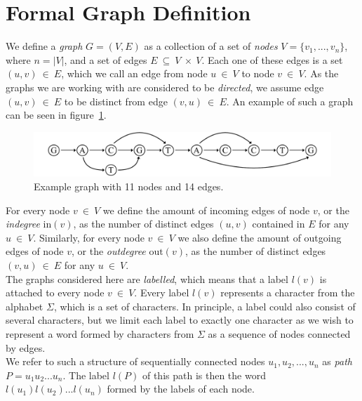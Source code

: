 \documentclass[a4paper,12pt,twoside,BCOR=10mm]{scrbook}
\begin{document}
\section{Formal Graph Definition}
\label{sec:graph_definition}
%
We define a \textit{graph} $ G = (V, E) $ as a collection of a set
of \textit{nodes} $ V = \{ v_1, ..., v_n \} $, where $ n = |V| $, and a set of edges $ E {\: \subseteq \:} V {\: \times \:} V $.
Each one of these edges is a set $ (u, v) {\: \in \:} E $,
which we call an edge from node $ u {\: \in \:} V $ to node $ v {\: \in \:} V $.
As the graphs we are working with are considered to be \textit{directed},
we assume edge $ (u, v) {\: \in \:} E $ to
be distinct from edge $ (v, u) {\: \in \:} E $.
An example of such a graph can be seen in figure~\ref{fig:evo_fig_graph_example}.

\begin{figure}[!htb]
\centering
\includegraphics[width=\textwidth]{evo_fig_graph_example.pdf}
\caption[Example graph]{Example graph with 11 nodes and 14 edges.} \label{fig:evo_fig_graph_example}
\end{figure}

For every node $ v {\: \in \:} V $ we define the amount of incoming edges of
node $ v $, or the \textit{indegree} $ \textrm{in} ( v ) $, as the number of
distinct edges $ (u, v) $ contained in $ E $ for any $ u {\: \in \:} V $.
Similarly, for every node $ v {\: \in \:} V $ we also define the amount of outgoing edges of
node $ v $, or the \textit{outdegree} $ \textrm{out} ( v ) $, as the number of
distinct edges $ (v, u) {\: \in \:} E $ for any $ u {\: \in \:} V $. \\
The graphs considered here are \textit{labelled}, which means that a label $ l( v ) $ is attached
to every node $ v {\: \in \:} V $.
Every label $ l( v ) $ represents a character
from the alphabet $ \Sigma $, which is a set of characters.
In principle, a label could also consist of several characters,
but we limit each label to exactly one character as we wish to
represent a word formed by characters from $ \Sigma $ as a sequence of nodes
connected by edges. \\
We refer to such a structure of sequentially connected
nodes $ u_1, u_2, ..., u_n $ as \textit{path} $ P = u_1 u_2 ... u_n $.
The label $ l ( P ) $ of this path is then the word $ l ( u_1 ) l( u_2 ) ... l ( u_n ) $ formed by the labels of each node.
\end{document}
